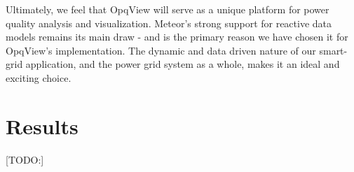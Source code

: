 \documentclass[conference]{IEEEtran}
\begin{document}
Ultimately, we feel that OpqView will serve as a unique platform for power quality analysis and visualization. Meteor’s strong support for reactive data models remains its main draw - and is the primary reason we have chosen it for OpqView’s implementation. The dynamic and data driven nature of our smart-grid application, and the power grid system as a whole, makes it an ideal and exciting choice.

\section{Results}

[TODO:]

%
%



%
%
\end{document}
